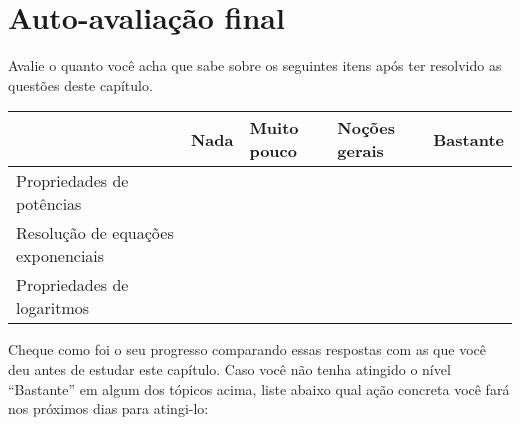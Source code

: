 \documentclass[main.tex]{subfiles}
\begin{document}
\section{Auto-avaliação final}
Avalie o quanto você acha que sabe sobre os seguintes itens após ter resolvido as questões deste capítulo.

\paraFolhaAvaliacoes

\begin{center}
 \begin{tabular}{|p{35mm}||p{15mm}|p{15mm}|p{15mm}|p{15mm}|} 
 \hline
   & Nada & Muito pouco & Noções gerais & Bastante\\
 \hline
 Propriedades de potências &  &  &  &  \\ 
 \hline
 Resolução de equações exponenciais&  &  &  &  \\
 \hline
 Propriedades de logaritmos &  &  &  &  \\
 \hline
\end{tabular}
\end{center}

Cheque como foi o seu progresso comparando essas respostas com as que você deu antes de estudar este capítulo. Caso você não tenha atingido o nível ``Bastante''  em algum dos tópicos acima, liste abaixo qual ação concreta você fará nos próximos dias para atingi-lo:

\paraAmbos
\end{document}

